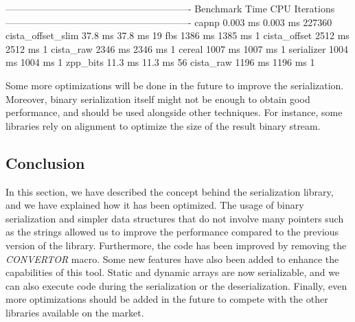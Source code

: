 \begin{terminal}
----------------------------------------------------------
Benchmark                Time             CPU   Iterations
----------------------------------------------------------
capnp                0.003 ms        0.003 ms       227360
cista_offset_slim     37.8 ms         37.8 ms           19
fbs                   1386 ms         1385 ms            1
cista_offset          2512 ms         2512 ms            1
cista_raw             2346 ms         2346 ms            1
cereal                1007 ms         1007 ms            1
serializer            1004 ms         1004 ms            1
zpp_bits              11.3 ms         11.3 ms           56
cista_raw             1196 ms         1196 ms            1
\end{terminal}\leavevmode\newline

Some more optimizations will be done in the future to improve the serialization.
Moreover, binary serialization itself might not be enough to obtain good
performance, and should be used alongside other techniques. For instance, some
libraries rely on alignment to optimize the size of the result binary stream.

\subsection{Conclusion}

In this section, we have described the concept behind the serialization library,
and we have explained how it has been optimized. The usage of binary
serialization and simpler data structures that do not involve many pointers such
as the strings allowed us to improve the performance compared to the previous
version of the library. Furthermore, the code has been improved by removing the
\textit{CONVERTOR} macro. Some new features have also been added to enhance the
capabilities of this tool. Static and dynamic arrays are now serializable, and
we can also execute code during the serialization or the deserialization.
Finally, even more optimizations should be added in the future to compete with
the other libraries available on the market.
